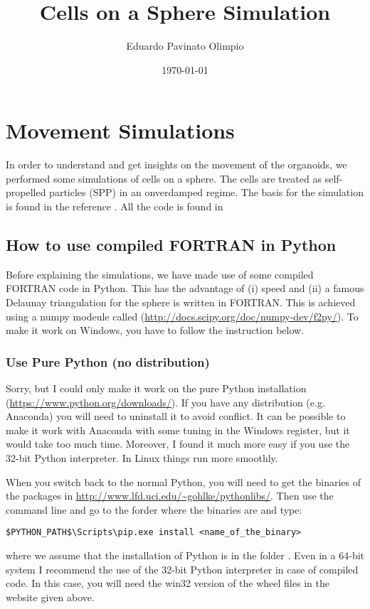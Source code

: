 \documentclass[12pt]{article}
\title{Cells on a Sphere Simulation}
\author{Eduardo Pavinato Olimpio}
\date{\today}
\begin{document}
\maketitle

\section{Movement Simulations}

In order to understand and get insights on the movement of the organoids, we performed some simulations of cells on a sphere. The cells are treated as self-propelled particles (SPP) in an onverdamped regime. The basis for the simulation is found in the reference \cite{Sknepnek2014}. All the code is found in 

\subsection{How to use compiled FORTRAN in Python}

Before explaining the simulations, we have made use of some compiled FORTRAN code in Python. This has the advantage of (i) speed and (ii) a famous Delaunay triangulation for the sphere is written in FORTRAN. This is achieved using a numpy modeule called  (\url{http://docs.scipy.org/doc/numpy-dev/f2py/}). To make it work on Windows, you have to follow the instruction below.

\subsubsection{Use Pure Python (no distribution)}

Sorry, but I could only make it work on the pure Python installation (\url{https://www.python.org/downloads/}). If you have any distribution (e.g. Anaconda) you will need to uninstall it to avoid conflict. It can be possible to make it work with Anaconda with some tuning in the Windows register, but it would take too much time. Moreover, I found it much more easy if you use the 32-bit Python interpreter. In Linux things run more smoothly.

When you switch back to the normal Python, you will need to get the binaries of the packages in \url{http://www.lfd.uci.edu/~gohlke/pythonlibs/}. Then use the command line and go to the forder where the binaries are and type:

\begin{verbatim}
$PYTHON_PATH$\Scripts\pip.exe install <name_of_the_binary>
\end{verbatim}
where we assume that the installation of Python is in the folder . Even in a 64-bit system I recommend the use of the 32-bit Python interpreter in case of compiled code. In this case, you will need the win32 version of the wheel files in the website given above.
\end{document}
